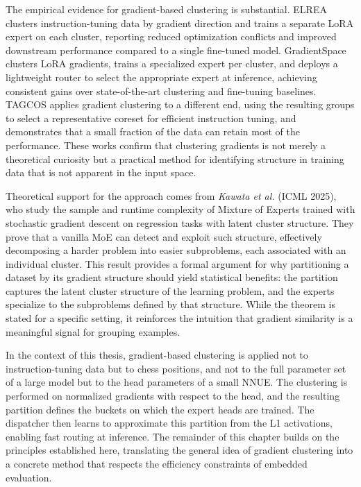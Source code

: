 The empirical evidence for gradient-based clustering is substantial. ELREA clusters instruction-tuning data by gradient direction and trains a separate LoRA expert on each cluster, reporting reduced optimization conflicts and improved downstream performance compared to a single fine-tuned model. GradientSpace clusters LoRA gradients, trains a specialized expert per cluster, and deploys a lightweight router to select the appropriate expert at inference, achieving consistent gains over state-of-the-art clustering and fine-tuning baselines. TAGCOS applies gradient clustering to a different end, using the resulting groups to select a representative coreset for efficient instruction tuning, and demonstrates that a small fraction of the data can retain most of the performance. These works confirm that clustering gradients is not merely a theoretical curiosity but a practical method for identifying structure in training data that is not apparent in the input space.

Theoretical support for the approach comes from \emph{Kawata et al.} (ICML 2025), who study the sample and runtime complexity of Mixture of Experts trained with stochastic gradient descent on regression tasks with latent cluster structure. They prove that a vanilla MoE can detect and exploit such structure, effectively decomposing a harder problem into easier subproblems, each associated with an individual cluster. This result provides a formal argument for why partitioning a dataset by its gradient structure should yield statistical benefits: the partition captures the latent cluster structure of the learning problem, and the experts specialize to the subproblems defined by that structure. While the theorem is stated for a specific setting, it reinforces the intuition that gradient similarity is a meaningful signal for grouping examples.


In the context of this thesis, gradient-based clustering is applied not to instruction-tuning data but to chess positions, and not to the full parameter set of a large model but to the head parameters of a small NNUE. The clustering is performed on normalized gradients with respect to the head, and the resulting partition defines the buckets on which the expert heads are trained. The dispatcher then learns to approximate this partition from the L1 activations, enabling fast routing at inference. The remainder of this chapter builds on the principles established here, translating the general idea of gradient clustering into a concrete method that respects the efficiency constraints of embedded evaluation.




